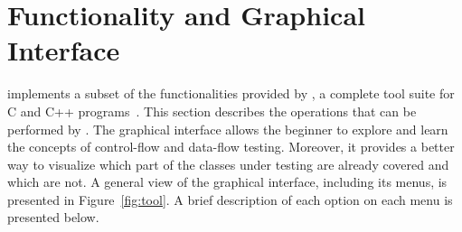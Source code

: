 
\section{\toolname Functionality and Graphical
Interface}\label{sec:tool}

\toolname implements a subset of the functionalities provided by
\xSuds, a complete tool suite for C and C++
programs~\cite{Agrawal98MSTA}. This section describes the
operations that can be performed by \toolname. The graphical
interface allows the beginner to explore and learn the concepts of
control-flow and data-flow testing. Moreover, it provides a better
way to visualize which part of the classes under testing are
already covered and which are not. A general view of the \toolname
graphical interface, including its menus, is presented in
Figure~\ref{fig:tool}. A brief description of each option on each
menu is presented below.



